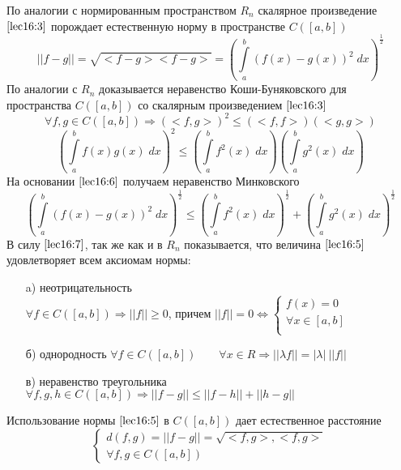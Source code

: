 \documentclass[../../main.tex]{subfiles}
\begin{document}
	 По аналогии с нормированным пространством $R_n$ скалярное произведение
	  $\eqref{lec16:3}$ порождает естественную норму в пространстве $C(\left[a,
	   b\right])$
	 \begin{equation}
	 \label{lec16:5}
	 ||f - g|| = \sqrt{<f - g><f - g>} = \left(\int \limits_a^b (f(x) - g(x))^2
	  \; dx\right)^\frac{1}{2}
	 \end{equation}
	 По аналогии с $R_n$ доказывается неравенство Коши-Буняковского для пространства
	  $C(\left[a, b\right])$ со скалярным произведением $\eqref{lec16:3}$	
	 \[ \forall f, g \in C(\left[a, b\right]) \Rightarrow (<f, g>)^2 \leq (<f, f>)(<g, g>)\]
	 \begin{equation}
	\label{lec16:6}
	 \left(\int\limits_a^bf(x)g(x)\; dx\right)^2 \le \left(\int \limits_a^b
	  f^2(x)\; dx\right)\left(\int \limits_a^b g^2(x)\; dx\right) 
	 \end{equation}
	 На основании $\eqref{lec16:6}$ получаем неравенство Минковского
	 \begin{equation}
	 \label{lec16:7}
	  \left(\int\limits_a^b(f(x) - g(x))^2\; dx\right)^\frac{1}{2} \le \left(\int
	   \limits_a^b f^2(x)\; dx\right)^\frac{1}{2} + \left(\int \limits_a^b g^2(x)\; dx\right) ^ \frac{1}{2}
	 \end{equation}
	 В силу $\eqref{lec16:7}$, так же как и в $R_n$ показывается, что величина
	  $\eqref{lec16:5}$ удовлетворяет всем аксиомам нормы:
	 \begin{itemize}
	 \item[a)]неотрицательность \\
	 $\forall f \in C(\left[a, b\right]) \Rightarrow ||f|| \geq 0$, причем $||f|| = 0
	  \Leftrightarrow \begin{cases}
	 f(x) = 0\\\forall x \in \left[a, b\right]\\
	 \end{cases}$
	 	\item[б)] однородность
	 $\forall f \in C(\left[a, b\right]) \qquad \forall x \in R \Rightarrow ||\lambda
	  f|| = |\lambda| \ ||f||$\\
	 \item[в)] неравенство треугольника
	 $\forall f, g, h \in C(\left[a, b\right]) \Rightarrow ||f - g|| \leq ||f - h|| + ||h - g||$
	 	\end{itemize}
	 Использование нормы $\eqref{lec16:5}$ в $C(\left[a, b\right])$ дает естественное расстояние
	 \begin{equation}
	 \label{lec16:8}
	 \begin{cases}
	 d(f, g) = ||f - g|| = \sqrt{<f, g>, <f, g>}\\
	 \forall f, g \in C(\left[a, b\right])
	 \end{cases}
	 \end{equation}
\end{document}
